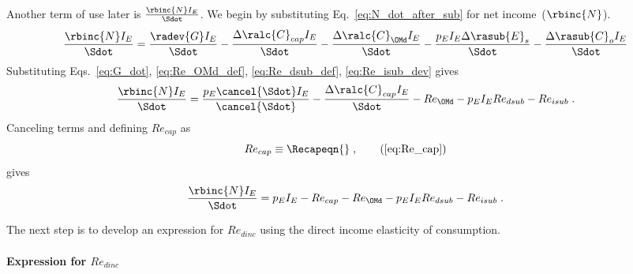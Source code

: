 Another term of use later is $\frac{\rbinc{N} I_E}{\Sdot}$.
We begin by substituting Eq.~\ref{eq:N_dot_after_sub} for net income~($\rbinc{N}$).
%
\begin{equation}
  \frac{\rbinc{N} I_E}{\Sdot} = \frac{\radev{G} I_E}{\Sdot}
                                - \frac{\Delta \ralc{C}_{cap} I_E}{\Sdot}
                                - \frac{\Delta \ralc{C}_{\OMd} I_E}{\Sdot}
                                - \frac{p_E I_E \Delta \rasub{E}_s}{\Sdot}
                                - \frac{\Delta \rasub{C}_o I_E}{\Sdot}
\end{equation}
%
Substituting Eqs.~\ref{eq:G_dot}, \ref{eq:Re_OMd_def}, \ref{eq:Re_dsub_def}, \ref{eq:Re_isub_dev} gives
%
\begin{equation}
  \frac{\rbinc{N} I_E}{\Sdot} = \frac{p_E \cancel{\Sdot} I_E}{\cancel{\Sdot}}
                                - \frac{\Delta \ralc{C}_{cap} I_E}{\Sdot}
                                - Re_{\OMd}
                                - p_E I_E Re_{dsub}
                                - Re_{isub} \; .
\end{equation}
%
Canceling terms and defining $Re_{cap}$ as
%
\begin{equation}
  Re_{cap} \equiv \Recapeqn{} \; , \tag{\ref{eq:Re_cap}}
\end{equation}
%
gives
%
\begin{equation} \label{eq:N_dot_I_E_Sdot}
  \frac{\rbinc{N} I_E}{\Sdot} = p_E I_E
                                - Re_{cap}
                                - Re_{\OMd}
                                - p_E I_E Re_{dsub}
                                - Re_{isub} \; .
\end{equation}

The next step is to develop an expression for $Re_{dinc}$
using the direct income elasticity of consumption.


\paragraph{Expression for $Re_{dinc}$}
\label{sec:Re_dinc}

